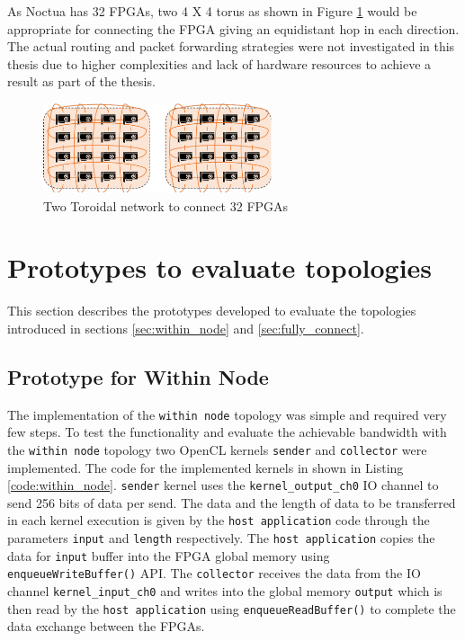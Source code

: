 As Noctua has 32 FPGAs, two 4 X 4 torus as shown in Figure \ref{fig:toroidal}
would be appropriate for connecting the FPGA giving an equidistant
hop in each direction. The actual routing and packet forwarding strategies
were not investigated in this thesis due to higher complexities
and lack of hardware resources to achieve a result as part of the thesis.

\begin{figure}[h]%
    \centering
    \includegraphics[width=0.6\textwidth]{images/torus}
    \caption{Two Toroidal network to connect 32 FPGAs}
    \label{fig:toroidal}
\end{figure}

\section{Prototypes to evaluate topologies}
\label{sec:proto_topo}

This section describes the prototypes developed to evaluate the topologies
introduced in sections \ref{sec:within_node} and \ref{sec:fully_connect}.

\subsection{Prototype for Within Node}

The implementation of the \texttt{within node} topology was simple and required very few
steps. To test the functionality and evaluate the achievable bandwidth with the
\texttt{within node} topology two OpenCL kernels \texttt{sender} and \texttt{collector}
were implemented. The code for the implemented kernels in shown in Listing
\ref{code:within_node}. \texttt{sender} kernel uses the
\texttt{kernel\_output\_ch0} IO channel to send 256 bits of data per send.
The data and the length of data to be transferred in each kernel execution
is given by the \texttt{host application} code through the parameters \texttt{input} and
\texttt{length} respectively. The \texttt{host application} copies the data for \texttt{input}
buffer into the FPGA global memory using \texttt{enqueueWriteBuffer()} API.
The \texttt{collector} receives the data from the IO channel \texttt{kernel\_input\_ch0}
and writes into the global memory \texttt{output} which
is then read by the \texttt{host application} using \texttt{enqueueReadBuffer()} to complete
the data exchange between the FPGAs.

